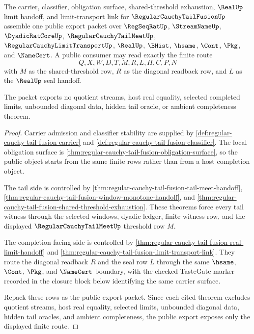\begin{theorem}
\label{thm:regular-cauchy-tail-fusion-public-export-packet}
The carrier, classifier, obligation surface, shared-threshold exhaustion, $\RealUp$ limit handoff, and limit-transport link for $\RegularCauchyTailFusionUp$ assemble one public export packet over $\RegSeqRatUp$, $\StreamNameUp$, $\DyadicRatCoreUp$, $\RegularCauchyTailMeetUp$, $\RegularCauchyLimitTransportUp$, $\RealUp$, $\BHist$, $\hsame$, $\Cont$, $\Pkg$, and $\NameCert$. A public consumer may read exactly the finite route
$$
Q,X,W,D,T,M,R,L,H,C,P,N
$$
with $M$ as the shared-threshold row, $R$ as the diagonal readback row, and $L$ as the $\RealUp$ seal handoff.

The packet exports no quotient streams, host real equality, selected completed limits, unbounded diagonal data, hidden tail oracle, or ambient completeness theorem.
\end{theorem}
\begin{proof}
Carrier admission and classifier stability are supplied by \autoref{def:regular-cauchy-tail-fusion-carrier} and \autoref{def:regular-cauchy-tail-fusion-classifier}. The local obligation surface is \autoref{thm:regular-cauchy-tail-fusion-obligation-surface}, so the public object starts from the same finite rows rather than from a host completion object.

The tail side is controlled by \autoref{thm:regular-cauchy-tail-fusion-tail-meet-handoff}, \autoref{thm:regular-cauchy-tail-fusion-window-monotone-handoff}, and \autoref{thm:regular-cauchy-tail-fusion-shared-threshold-exhaustion}. These theorems force every tail witness through the selected windows, dyadic ledger, finite witness row, and the displayed $\RegularCauchyTailMeetUp$ threshold row $M$.

The completion-facing side is controlled by \autoref{thm:regular-cauchy-tail-fusion-real-limit-handoff} and \autoref{thm:regular-cauchy-tail-fusion-limit-transport-link}. They route the diagonal readback $R$ and the seal row $L$ through the same $\hsame$, $\Cont$, $\Pkg$, and $\NameCert$ boundary, with the checked TasteGate marker recorded in the closure block below identifying the same carrier surface.

Repack these rows as the public export packet. Since each cited theorem excludes quotient streams, host real equality, selected limits, unbounded diagonal data, hidden tail oracles, and ambient completeness, the public export exposes only the displayed finite route.
\end{proof}

